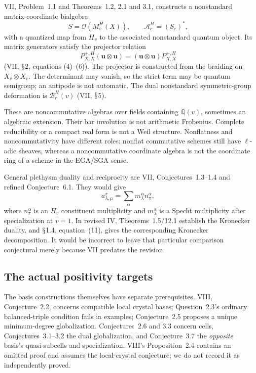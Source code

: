\documentclass[11pt,a4paper]{article}
\newcommand{\Q}{\mathbb Q}\newcommand{\Z}{\mathbb Z}\newcommand{\C}{\mathbb C}\newcommand{\N}{\mathbb N}\newcommand{\F}{\mathbb F}
\renewcommand{\S}{\ensuremath{\mathsection}}
\theoremstyle{named}\newtheorem{finding}{Finding}[section]
\theoremstyle{definition}\newtheorem{definition}[finding]{Definition}
\theoremstyle{remark}\newtheorem{remark}[finding]{Remark}
\begin{document}
VII, Problem~1.1 and Theorems~1.2, 2.1 and 3.1, constructs a nonstandard matrix-coordinate bialgebra
\[
 S=\mathcal O(M_v^H(X)),\qquad \mathcal A_r^H=(S_r)^*,
\]
with a quantized map from $H_v$ to the associated nonstandard quantum object. Its matrix generators satisfy the projector relation
\[
 P^{+,H}_{X,X}(\mathbf u\otimes\mathbf u)
 =(\mathbf u\otimes\mathbf u)P^{+,H}_{X,X}
\]
(VII, \S2, equations (4)--(6)). The projector is constructed from the braiding on $X_v\otimes X_v$. The determinant may vanish, so the strict term may be quantum semigroup; an antipode is not automatic. The dual nonstandard symmetric-group deformation is $\mathcal B_r^H(v)$ (VII, \S5).

These are noncommutative algebras over fields containing $\Q(v)$, sometimes an algebraic extension. Their bar involution is not arithmetic Frobenius. Complete reducibility or a compact real form is not a Weil structure. Nonflatness and noncommutativity have different roles: nonflat commutative schemes still have \(\ell\)-adic sheaves, whereas a noncommutative coordinate algebra is not the coordinate ring of a scheme in the EGA/SGA sense.

General plethysm duality and reciprocity are VII, Conjectures~1.3--1.4 and refined Conjecture~6.1. They would give
\begin{equation}\label{eq:comparison}
a_{\lambda,\mu}^{\pi}=\sum_\alpha m_\lambda^\alpha n_\pi^\alpha,
\end{equation}
where $n_\pi^\alpha$ is an $H_v$ constituent multiplicity and $m_\lambda^\alpha$ is a Specht multiplicity after specialization at $v=1$. In revised IV, Theorems~1.5/12.1 establish the Kronecker duality, and \S1.4, equation~(11), gives the corresponding Kronecker decomposition. It would be incorrect to leave that particular comparison conjectural merely because VII predates the revision.

\subsection{The actual positivity targets}\label{sec:targets}
The basis constructions themselves have separate prerequisites. VIII, Conjecture~2.2, concerns compatible local crystal bases; Question~2.3's ordinary balanced-triple condition fails in examples; Conjecture~2.5 proposes a unique minimum-degree globalization. Conjectures~2.6 and 3.3 concern cells, Conjectures~3.1--3.2 the dual globalization, and Conjecture~3.7 the \emph{opposite} basis's quasi-subcells and specialization. VIII's Proposition~2.4 contains an omitted proof and assumes the local-crystal conjecture; we do not record it as independently proved.
\end{document}
